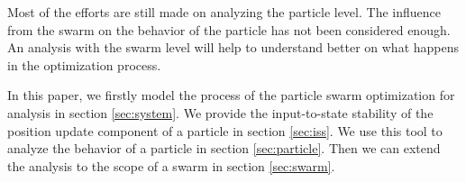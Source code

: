 Most of the efforts are still made on analyzing the particle level.
The influence from the swarm on the behavior of the particle has not been considered enough.
An analysis with the swarm level will help to understand better on what happens in the optimization process.

In this paper, we firstly model the process of the particle swarm optimization for analysis in section \ref{sec:system}.
We provide the input-to-state stability of the position update component of a particle in section \ref{sec:iss}.
We use this tool to analyze the behavior of a particle in section \ref{sec:particle}.
Then we can extend the analysis to the scope of a swarm in section \ref{sec:swarm}.
